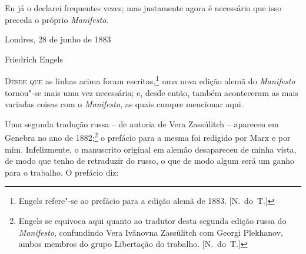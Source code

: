Eu já o declarei frequentes vezes; mas justamente agora é necessário que
isso preceda o próprio \mbox{\textit{Manifesto}}.
\smallskip

\hfill Londres, 28 de junho de 1883

\hfill Friedrich Engels


\textsc{Desde que} as linhas acima foram escritas,\footnote{ Engels refere"-se
ao prefácio para a edição alemã de 1883. [N.~do~T.]}  uma nova
edição alemã do \textit{Manifesto} tornou"-se mais uma vez necessária;
e, desde então, também aconteceram as mais variadas coisas com o
\textit{Manifesto}, as quais cumpre mencionar aqui. 

Uma segunda tradução russa – de autoria de Vera Zassúlitch – apareceu
em Genebra no ano de 1882;\footnote{ Engels se equivoca aqui quanto ao
tradutor desta segunda edição russa do \textit{Manifesto}, confundindo
Vera Ivânovna Zassúlitch com Georgi Plekhanov, ambos membros do grupo
Libertação do trabalho. [N.~do~T.]}  o prefácio para a
mesma foi redigido por Marx e por mim. Infelizmente, o manuscrito
original em alemão desapareceu de minha vista, de modo que tenho de
retraduzir do russo, o que de modo algum será um ganho para o trabalho.
O prefácio diz:

